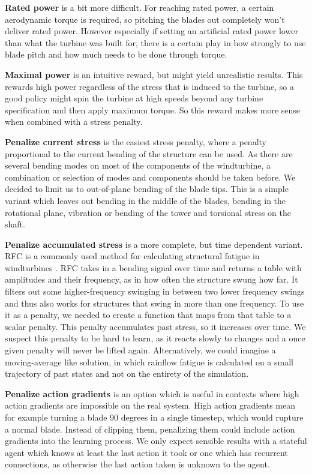 \documentclass[hyperref,final,beleg]{cgvpub}
\begin{document}
\textbf{Rated power} is a bit more difficult. For reaching rated power, a certain aerodynamic torque is required, so pitching the blades out completely won't deliver rated power. However especially if setting an artificial rated power lower than what the turbine was built for, there is a certain play in how strongly to use blade pitch and how much needs to be done through torque.

\textbf{Maximal power} is an intuitive reward, but might yield unrealistic results. This rewards high power regardless of the stress that is induced to the turbine, so a good policy might spin the turbine at high speeds beyond any turbine specification and then apply maximum torque. So this reward makes more sense when combined with a stress penalty.

\textbf{Penalize current stress} is the easiest stress penalty, where a penalty proportional to the current bending of the structure can be used. As there are several bending modes on most of the components of the windturbine, a combination or selection of modes and components should be taken before. We decided to limit us to out-of-plane bending of the blade tips. This is a simple variant which leaves out bending in the middle of the blades, bending in the rotational plane, vibration or bending of the tower and torsional stress on the shaft.

\textbf{Penalize accumulated stress} is a more complete, but time dependent variant. \ac{RFC} is a commonly used method for calculating structural fatigue in windturbines \cite{berglindFatigueEstimationMethods2014}. \ac{RFC} takes in a bending signal over time and returns a table with amplitudes and their frequency, as in how often the structure swung how far. It filters out some higher-frequency swinging in between two lower frequency swings and thus also works for structures that swing in more than one frequency. To use it as a penalty, we needed to create a function that maps from that table to a scalar penalty. This penalty accumulates past stress, so it increases over time. We suspect this penalty to be hard to learn, as it reacts slowly to changes and a once given penalty will never be lifted again. Alternatively, we could imagine a moving-average like solution, in which rainflow fatigue is calculated on a small trajectory of past states and not on the entirety of the simulation.

\textbf{Penalize action gradients} is an option which is useful in contexts where high action gradients are impossible on the real system. High action gradients mean for example turning a blade 90 degrees in a single timestep, which would rupture a normal blade. Instead of clipping them, penalizing them could include action gradients into the learning process. We only expect sensible results with a stateful agent which knows at least the last action it took or one which has recurrent connections, as otherwise the last action taken is unknown to the agent.
\end{document}
